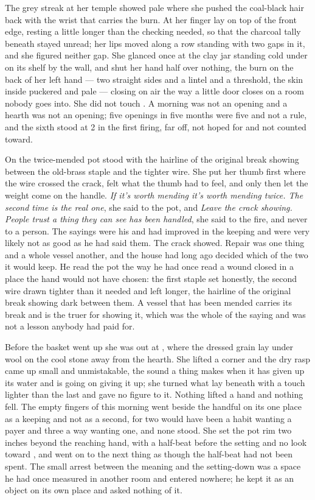 The grey streak at her temple showed pale where she pushed the coal-black hair back with the wrist that carries the burn. At  her finger lay on top of the front edge, resting a little longer than the checking needed, so that the charcoal tally beneath stayed unread; her lips moved along a row standing with two gaps in it, and she figured neither gap. She glanced once at the clay jar standing cold under  on its shelf by the wall, and shut her hand half over nothing, the burn on the back of her left hand --- two straight sides and a lintel and a threshold, the skin inside puckered and pale --- closing on air the way a little door closes on a room nobody goes into. She did not touch . A morning was not an opening and a hearth was not an opening; five openings in five months were five and not a rule, and the sixth stood at  2 in the first firing, far off, not hoped for and not counted toward.

On  the twice-mended pot stood with the hairline of the original break showing between the old-brass staple and the tighter wire. She put her thumb first where the wire crossed the crack, felt what the thumb had to feel, and only then let the weight come on the handle. \emph{If it's worth mending it's worth mending twice. The second time is the real one}, she said to the pot, and \emph{Leave the crack showing. People trust a thing they can see has been handled}, she said to the fire, and never to a person. The sayings were his and had improved in the keeping and were very likely not as good as he had said them. The crack showed. Repair was one thing and a whole vessel another, and the house had long ago decided which of the two it would keep. He read the pot the way he had once read a wound closed in a place the hand would not have chosen: the first staple set honestly, the second wire drawn tighter than it needed and left longer, the hairline of the original break showing dark between them. A vessel that has been mended carries its break and is the truer for showing it, which was the whole of the saying and was not a lesson anybody had paid for.

Before the basket went up she was out at , where the dressed grain lay under wool on the cool stone away from the hearth. She lifted a corner and the dry rasp came up small and unmistakable, the sound a thing makes when it has given up its water and is going on giving it up; she turned what lay beneath with a touch lighter than the last and gave no figure to it. Nothing lifted a hand and nothing fell. The empty fingers of this morning went beside the handful on its one place as a keeping and not as a second, for two would have been a habit wanting a payer and three a way wanting one, and none stood. She set the pot rim two inches beyond the reaching hand, with a half-beat before the setting and no look toward , and went on to the next thing as though the half-beat had not been spent. The small arrest between the meaning and the setting-down was a space he had once measured in another room and entered nowhere; he kept it as an object on its own place and asked nothing of it.

